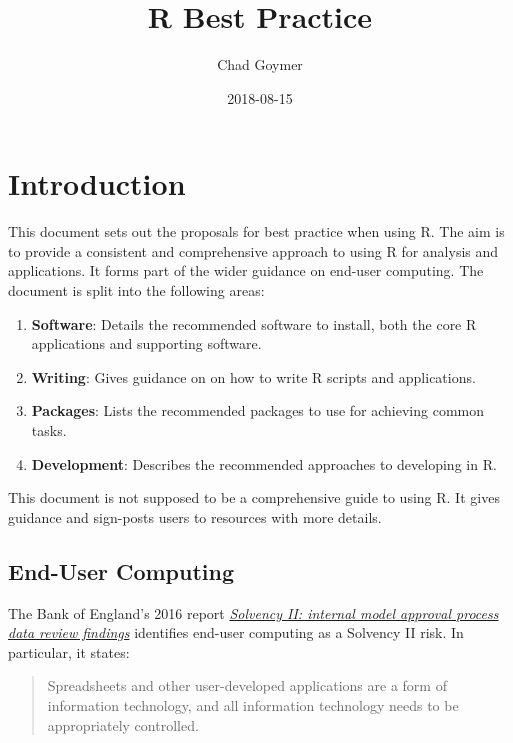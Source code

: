\documentclass[]{book}
\title{R Best Practice}
\author{Chad Goymer}
\date{2018-08-15}
\providecommand{\tightlist}{%
  \setlength{\itemsep}{0pt}\setlength{\parskip}{0pt}}
\theoremstyle{definition}
\theoremstyle{definition}
\theoremstyle{definition}
\theoremstyle{remark}
\begin{document}
\maketitle

{
\setcounter{tocdepth}{1}
\tableofcontents
}
\chapter{Introduction}\label{introduction}

This document sets out the proposals for best practice when using R. The
aim is to provide a consistent and comprehensive approach to using R for
analysis and applications. It forms part of the wider guidance on
end-user computing. The document is split into the following areas:

\begin{enumerate}
\def\labelenumi{\arabic{enumi}.}
\tightlist
\item
  \textbf{Software}: Details the recommended software to install, both
  the core R applications and supporting software.
\item
  \textbf{Writing}: Gives guidance on on how to write R scripts and
  applications.
\item
  \textbf{Packages}: Lists the recommended packages to use for achieving
  common tasks.
\item
  \textbf{Development}: Describes the recommended approaches to
  developing in R.
\end{enumerate}

This document is not supposed to be a comprehensive guide to using R. It
gives guidance and sign-posts users to resources with more details.

\section{End-User Computing}\label{end-user-computing}

The Bank of England's 2016 report
\href{https://www.bankofengland.co.uk/-/media/boe/files/prudential-regulation/publication/solvency-ii-internal-model-approved-process-data-review-findings-09-02-2016.pdf?la=en\&hash=873ED57439F79A32D0F00D7255BC0E436E9F85E5}{\emph{Solvency
II: internal model approval process data review findings}} identifies
end-user computing as a Solvency II risk. In particular, it states:

\begin{quote}
Spreadsheets and other user-developed applications are a form of
information technology, and all information technology needs to be
appropriately controlled.
\end{quote}
\end{document}
